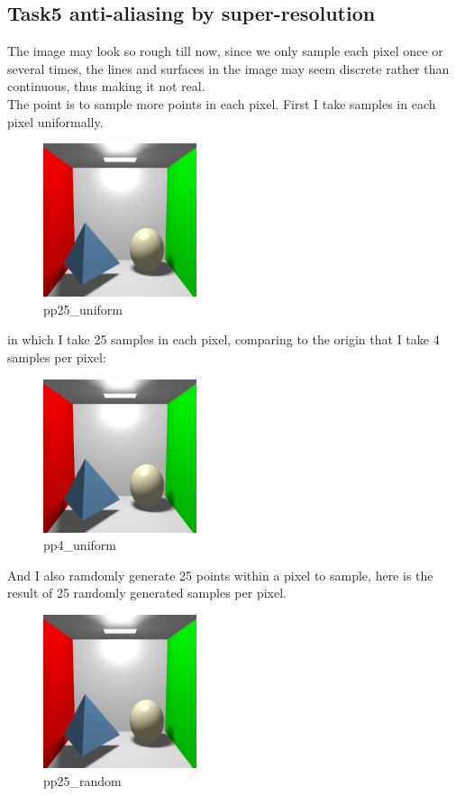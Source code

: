 \documentclass[acmtog]{acmart}
\begin{document}
\subsection{Task5 anti-aliasing by super-resolution}
The image may look so rough till now, since we only sample each pixel once or several times, the lines and surfaces in the image may seem discrete rather than continuous, thus making it not real.\\
The point is to sample more points in each pixel. First I take samples in each pixel uniformally.
\begin{figure}[h]
	\includegraphics[width=4.5cm,height=4.5cm]{pp25_uniform.png}
	\caption{pp25\_uniform}
\end{figure}
in which I take 25 samples in each pixel, comparing to the origin that I take 4 samples per pixel:\\
\begin{figure}[h]
	\includegraphics[width=4.5cm,height=4.5cm]{pp4_uniform.png}
	\caption{pp4\_uniform}
\end{figure}

And I also ramdomly generate 25 points within a pixel to sample, here is the result of 25 randomly generated samples per pixel.
\begin{figure}[h]
	\includegraphics[width=4.5cm,height=4.5cm]{pp25_random.png}
	\caption{pp25\_random}
\end{figure}
\end{document}
